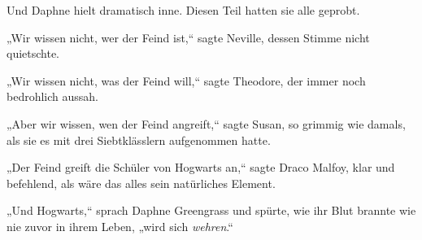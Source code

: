 Und Daphne hielt dramatisch inne. Diesen Teil hatten sie alle geprobt.

„Wir wissen nicht, wer der Feind ist,“ sagte Neville, dessen Stimme nicht quietschte.

„Wir wissen nicht, was der Feind will,“ sagte Theodore, der immer noch bedrohlich aussah.

„Aber wir wissen, wen der Feind angreift,“ sagte Susan, so grimmig wie damals, als sie es mit drei Siebtklässlern aufgenommen hatte.

„Der Feind greift die Schüler von Hogwarts an,“ sagte Draco Malfoy, klar und befehlend, als wäre das alles sein natürliches Element.

„Und Hogwarts,“ sprach Daphne Greengrass und spürte, wie ihr Blut brannte wie nie zuvor in ihrem Leben, „wird sich \emph{wehren}.“

